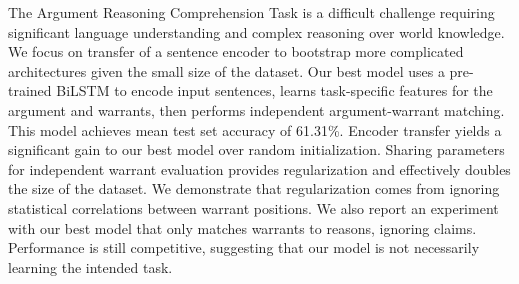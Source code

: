 The Argument Reasoning Comprehension Task is a difficult challenge requiring significant language understanding and complex reasoning over world knowledge. We focus on transfer of a sentence encoder to bootstrap more complicated architectures given the small size of the dataset. Our best model uses a pre-trained BiLSTM to encode input sentences, learns task-specific features for the argument and warrants, then performs independent argument-warrant matching. This model achieves mean test set accuracy of 61.31\%. Encoder transfer yields a significant gain to our best model over random initialization. Sharing parameters for independent warrant evaluation provides regularization and effectively doubles the size of the dataset. We demonstrate that regularization comes from ignoring statistical correlations between warrant positions. We also report an experiment with our best model that only matches warrants to reasons, ignoring claims. Performance is still competitive, suggesting that our model is not necessarily learning the intended task.

